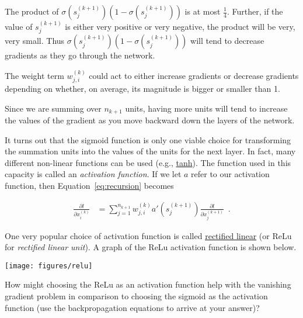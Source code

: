 \documentclass[assignment07_Solutions]{subfiles}
\begin{document}
\begin{exercise}
\begin{boxedsolution}
\bi
\item The product of $\sigma(s_j^{(k+1)})(1-\sigma(s_j^{(k+1)}))$ is at most $\frac{1}{4}$.  Further, if the value of $s_j^{(k+1)}$ is either very positive or very negative, the product will be very, very small.  Thus $\sigma(s_j^{(k+1)})(1-\sigma(s_j^{(k+1)}))$ will tend to decrease gradients as they go through the network.
\item The weight term $w_{j,i}^{(k)}$ could act to either increase gradients or decrease gradients depending on whether, on average, its magnitude is bigger or smaller than 1.
\item Since we are summing over $n_{k+1}$ units, having more units will tend to increase the values of the gradient as you move backward down the layers of the network.
\ei
\end{boxedsolution}

\item It turns out that the sigmoid function is only one viable choice for transforming the summation units into the values of the units for the next layer.  In fact, many different  non-linear functions can be used (e.g., \href{http://mathworld.wolfram.com/HyperbolicTangent.html}{tanh}).  The function used in this capacity is called an \emph{activation function}.  If we let $a$ refer to our activation function, then Equation~\ref{eq:recursion} becomes

\begin{align}
\frac{\partial l}{\partial x^{(k)}_i} &= \sum_{j=1}^{n_{k+1}} w^{(k)}_{j,i} a' \left ( s_{j}^{(k+1)} \right)  \frac{\partial l}{\partial x^{(k+1)}_j} \label{eq:recursion2} \enspace .
\end{align}


One very popular choice of activation function is called \href{https://en.wikipedia.org/wiki/Rectifier_(neural_networks)}{rectified linear} (or ReLu for \emph{rectified linear unit}).  A graph of the ReLu activation function is shown below.

\begin{center}
\texttt{[image: figures/relu]}
\end{center}

How might choosing the ReLu as an activation function help with the vanishing gradient problem in comparison to choosing the sigmoid as the activation function (use the backpropagation equations to arrive at your answer)?


\end{exercise}
\end{document}
